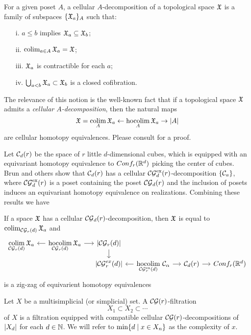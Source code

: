 \begin{definition}\label{cellulardecomposition}
	For a given poset $A$, a cellular $A$-decomposition of a topological space $\mathfrak{X}$ is a family of subspaces $\{\mathfrak{X}_a\}_A$ such that:
	\begin{itemize}
		\item [i.] $a \leq b$ implies $\mathfrak{X}_a \subseteq \mathfrak{X}_b$;
		\item [ii.]$\operatorname*{colim}_{a \in A} \mathfrak{X}_a = \mathfrak{X}$;
		\item [iii.]$\mathfrak{X}_a$ is contractible for each $a$;
		\item[iv.] $\bigcup_{a<b} \mathfrak{X}_a \subset \mathfrak{X}_b$ is a closed cofibration.
	\end{itemize}
\end{definition}

The relevance of this notion is the well-known fact that if a topological space $\mathfrak{X}$ admits a \textit{cellular $A$-decomposition}, then the natural maps
\[
\mathfrak{X} = \operatorname*{colim}_A \mathfrak{X}_a \leftarrow \operatorname*{hocolim}_A \mathfrak{X}_a \to \lvert A\rvert
\]
are cellular homotopy equivalences.
Please consult \cite[\S1.7]{berger1997confspacemodel} for a proof.

Let $\mathcal{C}_d(r)$ be the space of $r$ little $d$-dimensional cubes, which is equipped with an equivariant homotopy equivalence to $Conf_{r}(\mathbb{R}^{d})$ picking the center of cubes.
Brun and others \cite{Brun} show that $\mathcal{C}_d(r)$ has a cellular $\mathcal{CG}^{\mathrm{ex}}_d(r)$-decomposition $\{\mathcal{C}_a\}$, where $\mathcal{CG}^{\mathrm{ex}}_d(r)$ is a poset containing the poset $\mathcal{CG}_d(r)$ and the inclusion of posets induces an equivariant homotopy equivalence on realizations.
Combining these results we have

\begin{proposition}
	If a space $\mathfrak{X}$ has a cellular $\mathcal{CG}_d(r)$-decomposition, then $\mathfrak{X}$ is equal to $\operatorname*{colim}_{\mathcal{CG}_r(d)} \mathfrak{X}_a$ and
	\begin{equation*}
		\begin{tikzcd}[column sep=small, row sep=5]
			\displaystyle \colim_{\CG_r(d)} \fX_a & \arrow[l] \displaystyle \hocolim_{\CG_r(d)} \fX_a \arrow[r] & \bars{\CG_r(d)} \arrow[d] & & \\ & &
			\bars{\CG^{ex}_r(d)} & \arrow[l] \displaystyle \hocolim_{\CG^\ex_r(d)}\,\cC_\alpha \arrow[r] & \cC_d(r) \arrow[r] & \conf{r}{d}
		\end{tikzcd}
	\end{equation*}
	is a zig-zag of equivarient homotopy equivalences
\end{proposition}

\begin{definition}
	Let $X$ be a multisimplicial (or simplicial) set.
	A $\mathcal{CG}(r)$-filtration
	\[
	X_1 \subset X_2 \subset \dotsb
	\]
	of $X$ is a filtration equipped with compatible cellular $\mathcal{CG}(r)$-decompositions of $\lvert X_d\rvert$ for each $d \in \mathbb{N}$.
	We will refer to $\min\{d \mid x \in X_n\}$ as the complexity of $x$.
\end{definition}